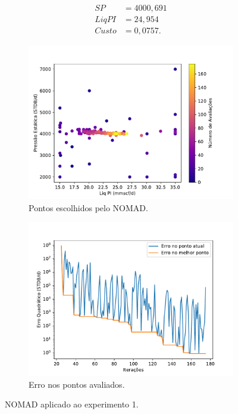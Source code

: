 \begin{align*}
SP&= 4000,691 \\
Liq PI &= 24,954 \\
Custo &= 0,0757.
\end{align*}



\begin{figure}[H]
\centering
\begin{subfigure}{0.5\textwidth}
  \centering
  \includegraphics[width=1\linewidth]{figs/setup1_eval_points.pdf}
  \caption{Pontos escolhidos pelo NOMAD.}
  \label{fig:setup1_points}
\end{subfigure}%
\begin{subfigure}{0.5\textwidth}
  \centering
  \includegraphics[width=1\linewidth]{figs/setup1_errors.pdf}
  \caption{Erro nos pontos avaliados.}
  \label{fig:setup1_error}
\end{subfigure}
\caption{NOMAD aplicado ao experimento 1.}
\label{fig:setup1_2}
\end{figure}

